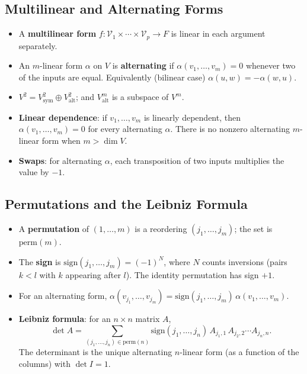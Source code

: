 \documentclass[hidelinks]{article}
\begin{document}
\subsection{Multilinear and Alternating Forms}
\begin{itemize}
    \item A \textbf{multilinear form} $f:\mathcal V_1\times\cdots\times\mathcal V_p\to F$ is linear in each argument separately.
    \item An $m$-linear form $\alpha$ on $V$ is \textbf{alternating} if $\alpha(v_1,\ldots,v_m)=0$ whenever two of the inputs are equal. Equivalently (bilinear case) $\alpha(u,w) = -\alpha(w,u)$.
    \item $V^2 = V^2_{\mathrm{sym}} \oplus V^2_{\mathrm{alt}}$; and $V^m_{\mathrm{alt}}$ is a subspace of $V^m$.
    \item \textbf{Linear dependence}: if $v_1,\ldots,v_m$ is linearly dependent, then $\alpha(v_1,\ldots,v_m)=0$ for every alternating $\alpha$. There is no nonzero alternating $m$-linear form when $m > \dim V$.
    \item \textbf{Swaps}: for alternating $\alpha$, each transposition of two inputs multiplies the value by $-1$.
\end{itemize}

\subsection{Permutations and the Leibniz Formula}
\begin{itemize}
    \item A \textbf{permutation} of $(1,\ldots,m)$ is a reordering $(j_1,\ldots,j_m)$; the set is $\mathrm{perm}(m)$.
    \item The \textbf{sign} is $\mathrm{sign}(j_1,\ldots,j_m) = (-1)^N$, where $N$ counts inversions (pairs $k<l$ with $k$ appearing after $l$). The identity permutation has sign $+1$.
    \item For an alternating form, $\alpha(v_{j_1},\ldots,v_{j_m}) = \mathrm{sign}(j_1,\ldots,j_m)\,\alpha(v_1,\ldots,v_m)$.
    \item \textbf{Leibniz formula}: for an $n\times n$ matrix $A$,
    \[
        \det A = \sum_{(j_1,\ldots,j_n)\in\mathrm{perm}(n)} \mathrm{sign}(j_1,\ldots,j_n)\, A_{j_1,1}\,A_{j_2,2}\cdots A_{j_n,n}.
    \]
    The determinant is the unique alternating $n$-linear form (as a function of the columns) with $\det I = 1$.
\end{itemize}
\end{document}
